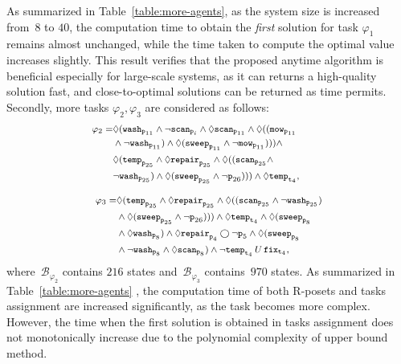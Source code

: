 As summarized in Table~\ref{table:more-agents},
as the system size is increased from~$8$ to $40$,
the computation time to obtain the \emph{first}
solution for task $\varphi_1$ remains almost unchanged,
while the time taken to compute the optimal value increases slightly.
This result verifies that the proposed anytime algorithm is beneficial
especially for large-scale systems, as it can returns a high-quality solution fast,
and close-to-optimal solutions can be returned as time permits.
Secondly, more tasks $\varphi_2,\varphi_3$ are considered as follows:
\begin{equation}\footnotesize
\label{eq:task2}
\begin{aligned}
\varphi_2 = &\Diamond (\texttt{wash}_{\texttt{p}_{11}} \land \lnot\texttt{scan}_{\texttt{p}_i} \wedge\Diamond \texttt{scan}_{\texttt{p}_{11}}\wedge \Diamond ((\texttt{mow}_{\texttt{p}_{11}}\quad\quad\quad \\
&\wedge\lnot \texttt{wash}_{\texttt{p}_{11}} ) \wedge\Diamond (\texttt{sweep}_{\texttt{p}_{11}} \land \lnot\texttt{mow}_{\texttt{p}_{11}} )))\wedge\\
&\Diamond (\texttt{temp}_{\texttt{p}_{25}} \land \Diamond \texttt{repair}_{\texttt{p}_{25}}\wedge \Diamond ((\texttt{scan}_{\texttt{p}_{25}}\wedge\\
&\lnot \texttt{wash}_{\texttt{p}_{25}} ) \wedge\Diamond (\texttt{sweep}_{\texttt{p}_{25}} \land \lnot{\texttt{p}_{26}} ))) \wedge  \Diamond
\texttt{temp}_{\texttt{t}_4},
\end{aligned}
\end{equation}

\begin{equation}\footnotesize
\label{eq:task3}
\begin{aligned}
\varphi_3 = &\Diamond (\texttt{temp}_{\texttt{p}_{25}} \land\Diamond \texttt{repair}_{\texttt{p}_{25}}
\wedge \Diamond ((\texttt{scan}_{\texttt{p}_{25}}\wedge
\lnot \texttt{wash}_{\texttt{p}_{25}} ) \\
&\wedge\Diamond (\texttt{sweep}_{\texttt{p}_{25}} \land \lnot{\texttt{p}_{26}} ))) \wedge  \Diamond
\texttt{temp}_{\texttt{t}_4}
\wedge  \Diamond (\texttt{sweep}_{\texttt{p}_{8}}\\& \wedge \Diamond \texttt{wash}_{\texttt{p}_{8}} )\land \Diamond \texttt{repair}_{\texttt{p}_4} \bigcirc \lnot \texttt{p}_5 \wedge \Diamond ( \texttt{sweep}_{\texttt{p}_{8}}\\
& \wedge \lnot \texttt{wash}_{\texttt{p}_{8}} \wedge\Diamond
\texttt{scan}_{\texttt{p}_{8}} )\wedge \lnot \texttt{temp}_{\texttt{t}_4} \,U \, \texttt{fix}_{\texttt{t}_{4}},
\end{aligned}
\end{equation}
where~$\mathcal{B}_{\varphi_2}$ contains $216$ states
	 and~$\mathcal{B}_{\varphi_3}$ contains~$970$ states.
	As summarized in Table~\ref{table:more-agents} , the computation time of
	 both R-posets and tasks assignment are increased significantly, as the task becomes more
	 complex.
	 However, the time when the first solution is obtained in tasks assignment does not monotonically increase due to
	 the polynomial complexity of upper bound method.






